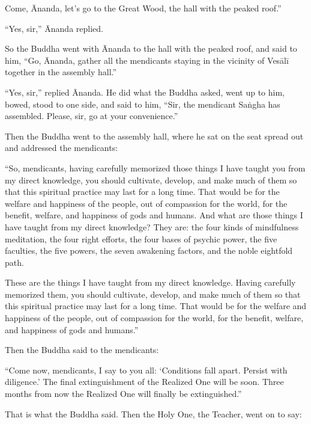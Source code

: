 \documentclass[12pt,openany]{book}%
\begin{document}
Come, Ānanda, let’s go to the Great Wood, the hall with the peaked roof.” 

“Yes, sir,” Ānanda replied. 

So the Buddha went with Ānanda to the hall with the peaked roof, and said to him, “Go, Ānanda, gather all the mendicants staying in the vicinity of \textsanskrit{Vesālī} together in the assembly hall.” 

“Yes, sir,” replied Ānanda. He did what the Buddha asked, went up to him, bowed, stood to one side, and said to him, “Sir, the mendicant \textsanskrit{Saṅgha} has assembled. Please, sir, go at your convenience.” 

Then the Buddha went to the assembly hall, where he sat on the seat spread out and addressed the mendicants: 

“So, mendicants, having carefully memorized those things I have taught you from my direct knowledge, you should cultivate, develop, and make much of them so that this spiritual practice may last for a long time. That would be for the welfare and happiness of the people, out of compassion for the world, for the benefit, welfare, and happiness of gods and humans. And what are those things I have taught from my direct knowledge? They are: the four kinds of mindfulness meditation, the four right efforts, the four bases of psychic power, the five faculties, the five powers, the seven awakening factors, and the noble eightfold path. 

These are the things I have taught from my direct knowledge. Having carefully memorized them, you should cultivate, develop, and make much of them so that this spiritual practice may last for a long time. That would be for the welfare and happiness of the people, out of compassion for the world, for the benefit, welfare, and happiness of gods and humans.” 

Then the Buddha said to the mendicants: 

“Come now, mendicants, I say to you all: ‘Conditions fall apart. Persist with diligence.’ The final extinguishment of the Realized One will be soon. Three months from now the Realized One will finally be extinguished.” 

That is what the Buddha said. Then the Holy One, the Teacher, went on to say: 
\end{document}
